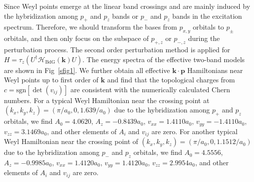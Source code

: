 \documentclass[aps,pra,floatfix,twocolumn,superscriptaddress]{revtex4-1}
\begin{document}
Since Weyl points emerge at the linear band crossings and are mainly induced by the hybridization  among $p_+$ and $p_z$ bands or $p_-$ and $p_z$ bands in the excitation spectrum. Therefore, we should transform the bases from $p_{x,y}$ orbitals to $p_{\pm}$ orbitals, and then only focus on the subspace of $p_{+,z}$ or $p_{-,z}$ during the perturbation process. The second order perturbation method is applied for $H=\tau_z(U^\dagger\mathcal{H}_{\mathrm{BdG}} (\mathbf{k}) U)$. The energy spectra of the effective two-band models are shown in Fig~\ref{sfig1}. We further obtain all effective $\mathbf{k}\cdot \mathbf{p}$ Hamiltonians near Weyl points up to first order of $\mathbf{k}$ and find that the topological charges from $c=\text{sgn}[\det (v_{ij})]$ are consistent with the numerically calculated Chern numbers. For a typical Weyl Hamiltonian near the crossing point at $(k_x,k_y,k_z)=(\pi/a_0,0,1.639/a_0)$ due to the hybridization among $p_+$ and $p_z$ orbitals, we find $A_0=4.0620$, $A_{z}=-0.8439a_0$, $v_{xx}=1.4110a_0$, $v_{yy}=-1.4110a_0$, $v_{zz}=3.1469a_0$, and other elements of $A_i$ and $v_{ij}$ are zero. For another typical Weyl Hamiltonian near the crossing point of $(k_x,k_y,k_z)=(\pi/a_0,0,1.1512/a_0)$ due to the hybridization among $p_-$ and $p_z$ orbitals, we find $A_0=4.5556$, $A_{z}=-0.9985a_0$, $v_{xx}=1.4120a_0$, $v_{yy}=1.4120a_0$, $v_{zz}=2.9954a_0$, and other elements of $A_i$ and $v_{ij}$ are zero.
\end{document}
